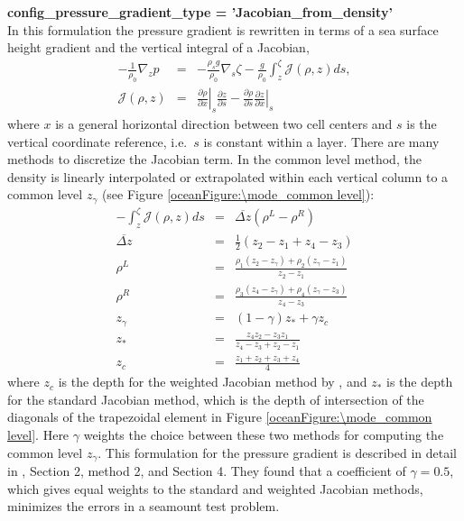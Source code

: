{\bf config\_pressure\_gradient\_type = 'Jacobian\_from\_density'}\\
In this formulation the pressure gradient is rewritten in terms of a sea surface height gradient and the vertical integral of a Jacobian,
\begin{eqnarray}
\label{ocean:\mode_grad p Jacobian}
- \frac{1}{\rho_0}\nabla_z p &=& - \frac{\rho_s g}{\rho_0}\nabla_s \zeta - \frac{g}{\rho_0}\int_z^\zeta {\mathcal J}(\rho,z)ds, \\
{\mathcal J}(\rho,z) &=& \left. \frac{\partial \rho}{\partial x} \right|_s \frac{\partial z}{\partial s} 
 - \frac{\partial \rho}{\partial s}  \left. \frac{\partial z}{\partial x} \right|_s 
\end{eqnarray}
where $x$ is a general horizontal direction between two cell centers and $s$ is the vertical coordinate reference, i.e.\ $s$ is constant within a layer.  There are many methods to discretize the Jacobian term.  In the common level method, the density is linearly interpolated or extrapolated within each vertical column to a common level $z_\gamma$ (see Figure \ref{oceanFigure:\mode_common level}):
\begin{eqnarray}
- \int_z^\zeta {\mathcal J}(\rho,z)ds &=& \overline{\Delta z} \left( \rho^L - \rho^R \right) \\
\overline{\Delta z} &=& \frac{1}{2} \left(z_2-z_1 + z_4-z_3\right) \\
\rho^L &=& \frac{\rho_1\left(z_2-z_\gamma\right) + \rho_2\left(z_\gamma-z_1\right) }{z_2-z_1}\\
\rho^R &=& \frac{\rho_3\left(z_4-z_\gamma\right) + \rho_4\left(z_\gamma-z_3\right) }{z_4-z_3}\\
z_\gamma &=& \left(1-\gamma\right)z_* + \gamma z_c \\
z_* &=&  \frac{z_4 z_2-z_3z_1}{z_4-z_3 + z_2-z_1} \\
z_c &=&  \frac{z_1+z_2+z_3+z_4}{4} 
\end{eqnarray}
where $z_c$ is the depth for the weighted Jacobian method by \citet{Song98mwr}, and $z_*$ is the depth for the standard Jacobian method, which is the depth of intersection of the diagonals of the trapezoidal element in Figure \ref{oceanFigure:\mode_common level}.  Here $\gamma$ weights the choice between these two methods for computing the common level $z_\gamma$.  This formulation for the pressure gradient is described in detail in \citet{Shchepetkin_McWilliams03jgr}, Section 2, method 2, and Section 4.  They found that a coefficient of $\gamma=0.5$, which gives equal weights to the standard and weighted Jacobian methods, minimizes the errors in a seamount test problem.

